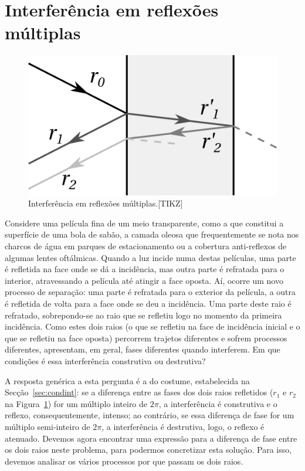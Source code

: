 \section{Interferência em reflexões múltiplas}
\begin{figure}
    {\centering
        \includegraphics[scale=0.9]{figs/f40-050.png}
        \caption{Interferência em reflexões múltiplas.[TIKZ]\label{fig:40-050}}

    }
\end{figure}
Considere uma película fina de um meio transparente, como a que constitui a
superfície de uma bola de sabão, a camada oleosa que frequentemente se nota nos
charcos de água em parques de estacionamento ou a cobertura anti-reflexos de
algumas lentes oftálmicas. Quando a luz incide numa destas películas, uma parte
é refletida na face onde se dá a incidência, mas outra parte é refratada para o
interior, atravessando a película até atingir a face oposta. Aí, ocorre um novo
processo de separação: uma parte é refratada para o exterior da película, a
outra é refletida de volta para a face onde se deu a incidência. Uma parte deste
raio é refratado, sobrepondo-se ao raio que se refletiu logo no momento da
primeira incidência. Como estes dois raios (o que se refletiu na face de
incidência inicial e o que se refletiu na face oposta) percorrem trajetos
diferentes e sofrem processos diferentes, apresentam, em geral, fases diferentes
quando interferem. Em que condições é essa interferência construtiva ou
destrutiva?

A resposta genérica a esta pergunta é a do costume, estabelecida na
Secção~\ref{sec:condint}: se a diferença entre as fases dos dois raios
refletidos ($r_1$ e $r_2$ na Figura~\ref{fig:40-050}) for um múltiplo inteiro de
$2\pi$, a interferência é construtiva e o reflexo, consequentemente, intenso; ao
contrário, se essa diferença de fase for um múltiplo semi-inteiro de $2\pi$, a
interferência é destrutiva, logo, o reflexo é atenuado. Devemos agora encontrar
uma expressão para a diferença de fase entre os dois raios neste problema, para
podermos concretizar esta solução. Para isso, devemos analisar os vários
processos por que passam os dois raios.

